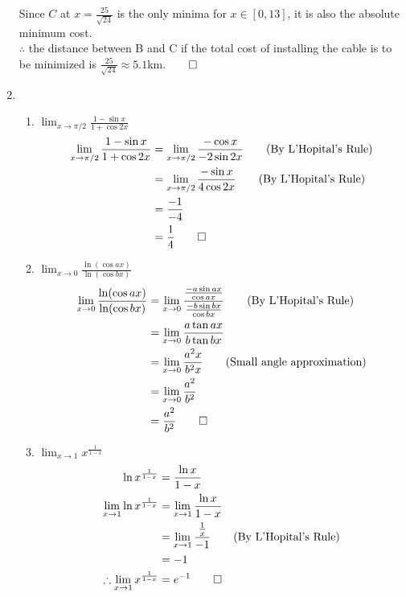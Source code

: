 \documentclass[12pt, a4paper]{article}
\begin{document}
\begin{enumerate}[Q\arabic*.]
    Since $C$ at $x = \frac{25}{\sqrt{24}}$ is the only minima for $x \in [0, 13]$, it is also the absolute minimum cost.\\
    $\therefore$ the distance between B and C if the total cost of installing the cable is to be minimized is $\frac{25}{\sqrt{24}} \approx 5.1$km.$\qed$
  \item \begin{enumerate}[(\alph*)]
      \item $\displaystyle \lim_{x\to\pi/2}\frac{1-\sin x}{1+\cos 2x}$
        \begin{align*}
          \lim_{x\to\pi/2}\frac{1-\sin x}{1+\cos 2x} &= \lim_{x\to\pi/2}\frac{-\cos x}{-2\sin 2x}\tag*{\text{(By L'Hopital's Rule)}}\\
                                                     &= \lim_{x\to\pi/2}\frac{-\sin x}{4\cos 2x}\tag*{\text{(By L'Hopital's Rule)}}\\
                                                     &= \frac{-1}{-4}\\
                                                     &= \frac{1}{4} \qed
        \end{align*}

      \item $\displaystyle \lim_{x\to 0}\frac{\ln(\cos ax)}{\ln(\cos bx)}$
        \begin{align*}
          \lim_{x\to 0}\frac{\ln(\cos ax)}{\ln(\cos bx)} &= \lim_{x\to 0}\frac{\frac{-a\sin ax}{\cos ax}}{\frac{-b\sin bx}{\cos bx}}\tag*{\text{(By L'Hopital's Rule)}}\\
                                                         &= \lim_{x\to 0}\frac{a\tan ax}{b\tan bx}\\
                                                         &= \lim_{x\to 0}\frac{a^2x}{b^2x}\tag*{\text{(Small angle approximation)}}\\
                                                         &= \lim_{x\to0}\frac{a^2}{b^2} \\
                                                         &= \frac{a^2}{b^2} \qed
       \end{align*}

     \item $\displaystyle \lim_{x\to 1}x^{\frac{1}{1-x}}$
       \begin{align*}
         \ln x^{\frac{1}{1-x}} &= \frac{\ln x}{1-x}\\
         \lim_{x\to 1}\ln x^{\frac{1}{1-x}} &= \lim_{x\to 1}\frac{\ln x}{1-x}\\
                                            &= \lim_{x\to 1}\frac{\frac{1}{x}}{-1}\tag*{\text{(By L'Hopital's Rule)}}\\
                                            &= -1\\
         \therefore \lim_{x\to 1}x^{\frac{1}{1-x}} &= e^{-1} \qed
       \end{align*}


\end{enumerate}
\end{enumerate}
\end{document}
